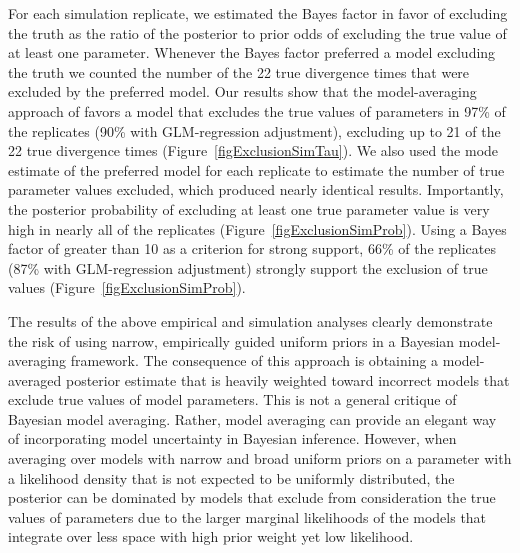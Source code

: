For each simulation replicate, we estimated the Bayes factor in favor
of excluding the truth as the ratio of the posterior to prior odds of
excluding the true value of at least one parameter.
Whenever the Bayes factor preferred a model excluding the truth we counted the
number of the 22 true divergence times that were excluded by the preferred
model.
Our results show that the model-averaging approach of \citet{Hickerson2013}
favors a model that excludes the true values of parameters in 97\% of the
replicates (90\% with GLM-regression adjustment), excluding up to 21 of the 22
true divergence times (Figure~\ref{figExclusionSimTau}).
We also used the mode estimate of the preferred model for each replicate to
estimate the number of true parameter values excluded, which produced nearly
identical results.
Importantly, the posterior probability of excluding at least one true parameter
value is very high in nearly all of the replicates
(Figure~\ref{figExclusionSimProb}).
Using a Bayes factor of greater than 10 as a criterion for strong support, 66\%
of the replicates (87\% with GLM-regression adjustment) strongly support the
exclusion of true values (Figure~\ref{figExclusionSimProb}).

The results of the above empirical and simulation analyses clearly demonstrate
the risk of using narrow, empirically guided uniform priors in a Bayesian
model-averaging framework.
The consequence of this approach is obtaining a model-averaged posterior
estimate that is heavily weighted toward incorrect models that exclude true
values of model parameters.
This is not a general critique of Bayesian model averaging.
Rather, model averaging can provide an elegant way of incorporating
model uncertainty in Bayesian inference.
However, when averaging over models with narrow and broad uniform priors on a
parameter with a likelihood density that is not expected to be uniformly
distributed, the posterior can be dominated by models that exclude from
consideration the true values of parameters due to the larger marginal
likelihoods of the models that integrate over less space with high prior
weight yet low likelihood.


